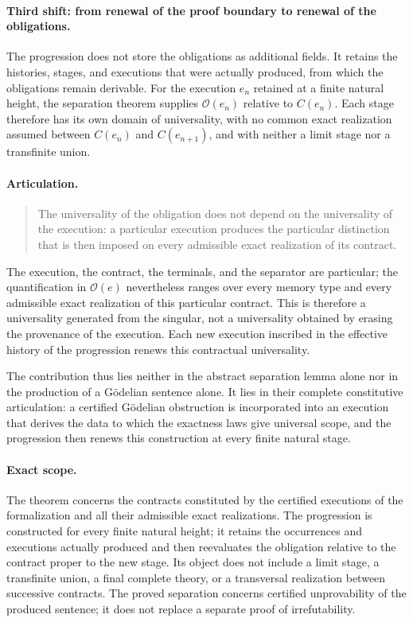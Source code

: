 \documentclass[11pt,a4paper]{article}
\theoremstyle{remark}
\begin{document}
\paragraph{Third shift: from renewal of the proof boundary to renewal of the
obligations.}
The progression does not store the obligations as additional fields. It
retains the histories, stages, and executions that were actually produced,
from which the obligations remain derivable. For the execution $e_n$ retained
at a finite natural height, the separation theorem supplies $\mathcal O(e_n)$
relative to $C(e_n)$. Each stage therefore has its own domain of universality,
with no common exact realization assumed between $C(e_n)$ and $C(e_{n+1})$,
and with neither a limit stage nor a transfinite union.

\paragraph{Articulation.}
\begin{quote}
The universality of the obligation does not depend on the universality of the
execution: a particular execution produces the particular distinction that
is then imposed on every admissible exact realization of its contract.
\end{quote}
The execution, the contract, the terminals, and the separator are particular;
the quantification in $\mathcal O(e)$ nevertheless ranges over every memory
type and every admissible exact realization of this particular contract. This
is therefore a universality generated from the singular, not a universality
obtained by erasing the provenance of the execution. Each new execution
inscribed in the effective history of the progression renews this contractual
universality.

The contribution thus lies neither in the abstract separation lemma alone
nor in the production of a Gödelian sentence alone. It lies in their complete
constitutive articulation: a certified Gödelian obstruction is incorporated
into an execution that derives the data to which the exactness laws give
universal scope, and the progression then renews this construction at every
finite natural stage.

\paragraph{Exact scope.}
The theorem concerns the contracts constituted by the certified executions
of the formalization and all their admissible exact realizations. The
progression is constructed for every finite natural height; it retains the
occurrences and executions actually produced and then reevaluates the
obligation relative to the contract proper to the new stage. Its object does
not include a limit stage, a transfinite union, a final complete theory, or
a transversal realization between successive contracts. The proved
separation concerns certified unprovability of the produced sentence; it
does not replace a separate proof of irrefutability.
\end{document}

